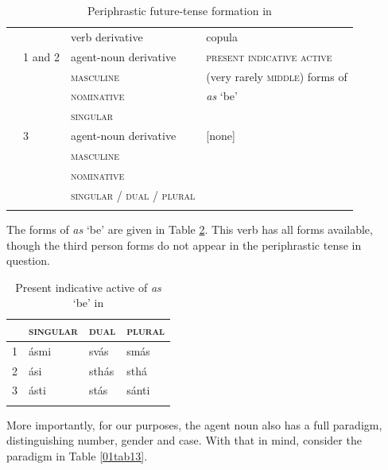 \documentclass[output=paper,colorlinks,citecolor=brown]{langscibook}
\begin{document}
\begin{table}[ht]
	\centering
	\captionsetup{width=\textwidth}
	\caption{Periphrastic future-tense formation in  \citep[111]{stump2013}}
	\label{01tab11}
	\begin{tabularx}{\textwidth}{llXX}
		\lsptoprule
		\multicolumn{4}{c}{components} \\
		\midrule
		& & verb derivative & copula \\
		\midrule
		\multirow{8}{*}{\rotatebox{90}{\textsc{person}}} & 1 and 2 & agent-noun derivative & \textsc{present indicative active} \\
		& & \textsc{masculine} & (very rarely \textsc{middle}) forms of \\
		& & \textsc{nominative} & \textit{as} ‘be’ \\
		& & \textsc{singular} & \\
		& 3 & agent-noun derivative & [none] \\
		& & \textsc{masculine} & \\
		& & \textsc{nominative} & \\
		& & \textsc{singular / dual / plural} & \\
		\lspbottomrule
	\end{tabularx}
\end{table}

The forms of \textit{as} `be' are given in Table \ref{01tab12}. This verb has all forms available, though the third person forms do not appear in the periphrastic tense in question.

\begin{table}[ht]
	\centering
	\captionsetup{width=\textwidth}
	\caption{Present indicative active of \textit{as} ‘be’ in  \citep[111]{stump2013}}
	\label{01tab12}
	\begin{tabularx}{0.6\textwidth}{XXXX}
		\lsptoprule
			& \textsc{singular} & \textsc{dual} & \textsc{plural} \\
			\midrule
			1 & ásmi & svás & smás \\
			2 & ási & sthás & sthá \\
			3 & ásti & stás & sánti \\
		\lspbottomrule
	\end{tabularx}
\end{table}

More importantly, for our purposes, the agent noun also has a full paradigm, distinguishing number, gender and case. With that in mind, consider the paradigm in Table \ref{01tab13}.
\end{document}
